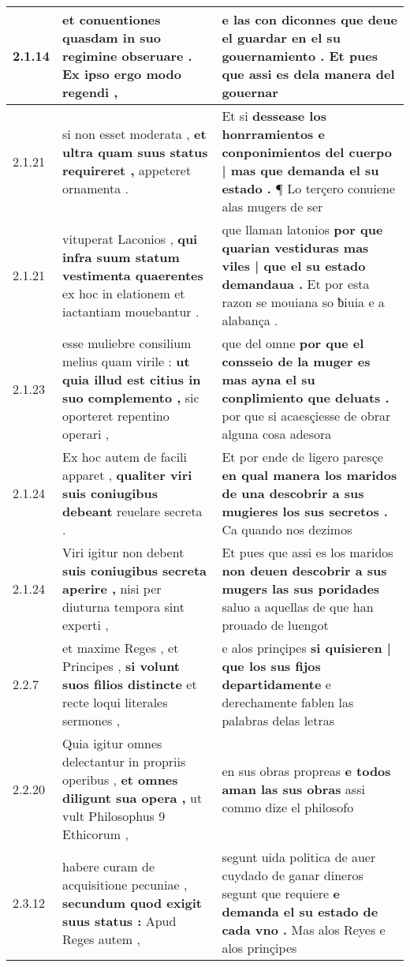 \begin{tabular}{|p{1cm}|p{6.5cm}|p{6.5cm}|}
2.1.14 & et conuentiones \textbf{ quasdam in suo regimine obseruare . } Ex ipso ergo modo regendi , & e las con diconnes \textbf{ que deue el guardar en el su gouernamiento . } Et pues que assi es dela manera del gouernar \\\hline
2.1.21 & si non esset moderata , \textbf{ et ultra quam suus status requireret , } appeteret ornamenta . & Et si \textbf{ dessease los honrramientos e conponimientos del cuerpo | mas que demanda el su estado . } ¶ Lo terçero conuiene alas mugers de ser \\\hline
2.1.21 & vituperat Laconios , \textbf{ qui infra suum statum vestimenta quaerentes } ex hoc in elationem et iactantiam mouebantur . & que llaman latonios \textbf{ por que quarian vestiduras mas viles | que el su estado demandaua . } Et por esta razon se mouiana so ƀiuia e a alabança . \\\hline
2.1.23 & esse muliebre consilium melius quam virile : \textbf{ ut quia illud est citius in suo complemento , } sic oporteret repentino operari , & que del omne \textbf{ por que el consseio de la muger es mas ayna el su conplimiento que deluats . } por que si acaesçiesse de obrar alguna cosa adesora \\\hline
2.1.24 & Ex hoc autem de facili apparet , \textbf{ qualiter viri suis coniugibus debeant } reuelare secreta . & Et por ende de ligero paresçe \textbf{ en qual manera los maridos de una descobrir a sus mugieres los sus secretos . } Ca quando nos dezimos \\\hline
2.1.24 & Viri igitur non debent \textbf{ suis coniugibus secreta aperire , } nisi per diuturna tempora sint experti , & Et pues que assi es los maridos \textbf{ non deuen descobrir a sus mugers las sus poridades } saluo a aquellas de que han prouado de luengot \\\hline
2.2.7 & et maxime Reges , et Principes , \textbf{ si volunt suos filios distincte } et recte loqui literales sermones , & e alos prinçipes \textbf{ si quisieren | que los sus fijos departidamente } e derechamente fablen las palabras delas letras \\\hline
2.2.20 & Quia igitur omnes delectantur in propriis operibus , \textbf{ et omnes diligunt sua opera , } ut vult Philosophus 9 Ethicorum , & en sus obras propreas \textbf{ e todos aman las sus obras } assi commo dize el philosofo \\\hline
2.3.12 & habere curam de acquisitione pecuniae , \textbf{ secundum quod exigit suus status : } Apud Reges autem , & segunt uida politica de auer cuydado de ganar dineros segunt que requiere \textbf{ e demanda el su estado de cada vno . } Mas alos Reyes e alos prinçipes \\\hline

\end{tabular}
